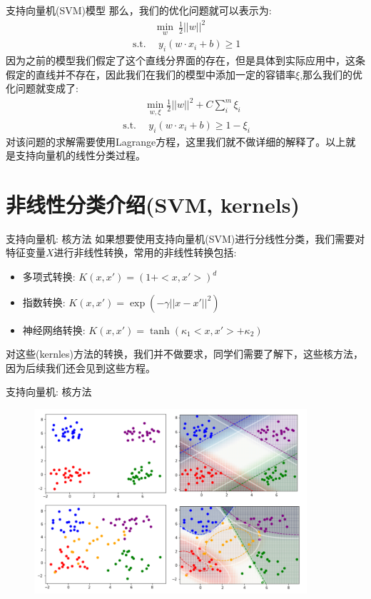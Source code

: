\documentclass[handout]{ctexbeamer}
\begin{document}
\begin{frame}{支持向量机(SVM)模型}
那么，我们的优化问题就可以表示为: 
\begin{align*}
	& \min_{w} \ \frac{1}{2} ||w ||^2 \\
	\ \text{s.t.} & \ \ y_i(w \cdot x_i + b)  \geq 1
\end{align*}
因为之前的模型我们假定了这个直线分界面的存在，但是具体到实际应用中，这条假定的直线并不存在，因此我们在我们的模型中添加一定的容错率$\xi$,那么我们的优化问题就变成了:
\begin{align*}
	& \min_{w, \xi} \frac{1}{2} ||w||^2 + C \sum_{i}^m \xi_i \\
	\ \text{s.t.} & \ \ y_i(w \cdot x_i + b) \geq  1 - \xi_i
\end{align*}
对该问题的求解需要使用Lagrange方程，这里我们就不做详细的解释了。以上就是支持向量机的线性分类过程。 
\end{frame}




\section{非线性分类介绍(SVM, kernels)}


\begin{frame}{支持向量机: 核方法}
	如果想要使用支持向量机(SVM)进行分线性分类，我们需要对特征变量$X$进行非线性转换，常用的非线性转换包括: 
\begin{itemize}
	\item 多项式转换: $K(x, x') = (1 + <x, x'>)^d$
	\item 指数转换: $K(x, x') = \exp(-\gamma ||x - x'||^2)$
	\item 神经网络转换: $K(x, x') = \tanh (\kappa_1 <x, x'> + \kappa_2)$
\end{itemize}
对这些(kernles)方法的转换，我们并不做要求，同学们需要了解下，这些核方法，因为后续我们还会见到这些方程。
\end{frame}

\begin{frame}{支持向量机: 核方法}
\begin{figure}[H]
	\centering
	\includegraphics[width=0.9\textwidth]{fig/C2preSVMvis}
\end{figure}	
\end{frame}
\end{document}
